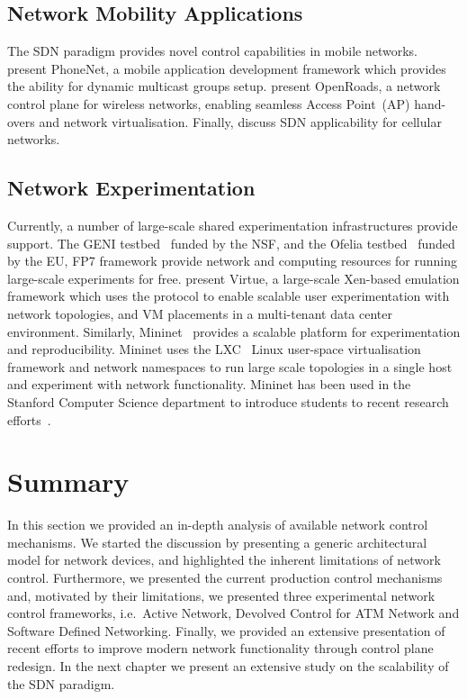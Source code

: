 \subsection{Network Mobility Applications}

The SDN paradigm provides novel control capabilities in mobile networks.
 present PhoneNet, a mobile application development framework
which provides the ability for dynamic multicast groups setup.
 present OpenRoads, a network control plane for wireless
networks, enabling seamless Access Point~(AP) hand-overs and network
virtualisation.  Finally,  discuss SDN applicability for
cellular networks.

\subsection{Network Experimentation}

Currently, a number of large-scale shared experimentation infrastructures provide
\of support. The GENI testbed~ funded by the NSF, and the Ofelia
testbed~ funded by the EU, FP7 framework provide network and
computing resources for running large-scale experiments for free.  
present Virtue, a large-scale Xen-based emulation framework which uses the \of
protocol to enable scalable user experimentation with network topologies, and VM
placements in a multi-tenant data center environment. Similarly,
Mininet~  provides a scalable platform  for \of
experimentation and reproducibility. Mininet uses the LXC~ Linux
user-space virtualisation framework and network namespaces to run large scale
topologies in a single host and experiment with network functionality.  Mininet
has been used in the Stanford Computer Science department to introduce students
to recent research efforts~. 

\section{Summary}

In this section we provided an in-depth analysis of available network control
mechanisms.  We started the discussion by presenting a generic architectural
model for network devices, and highlighted the inherent limitations of network
control. Furthermore, we presented the current production  control mechanisms
and, motivated by their limitations, we presented three experimental network
control frameworks, i.e.~Active Network, Devolved Control for ATM Network and
Software Defined Networking. Finally, we provided an extensive presentation of
recent efforts to improve modern network functionality through control plane
redesign. In the next chapter we present an extensive study on the scalability
of the SDN paradigm. 

